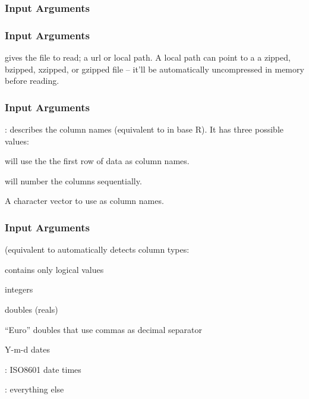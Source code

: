 \documentclass[12pt]{beamer}\usepackage[]{graphicx}\usepackage[]{color}
\begin{document}

\begin{frame}
\frametitle{Input Arguments}

\bbi
  \item {}
  \item {}
  \item {}
  \item {}
\ei

\end{frame}


\begin{frame}
\frametitle{Input Arguments}

{\hilit {}} gives the file to read; a url or local path. A local path can point to a a zipped, bzipped, xzipped, or gzipped file – it'll be automatically uncompressed in memory before reading. 

\end{frame}


\begin{frame}
\frametitle{Input Arguments}

{\hilit {}}: describes the column names (equivalent to  in base R). It has three possible values:

\bi
  \item {} will use the the first row of data as column names.
  \item {} will number the columns sequentially.
  \item A character vector to use as column names.
\ei

\end{frame}


\begin{frame}
\frametitle{Input Arguments}

{\hilit {}} (equivalent to  automatically detects column types:

\bi
  \item {} contains only logical values
  \item {} integers
  \item {} doubles (reals)
  \item {} ``Euro'' doubles that use commas  as decimal separator
  \item {} Y-m-d dates
  \item {}: ISO8601 date times
  \item {}: everything else
\ei

\end{frame}
\end{document}
